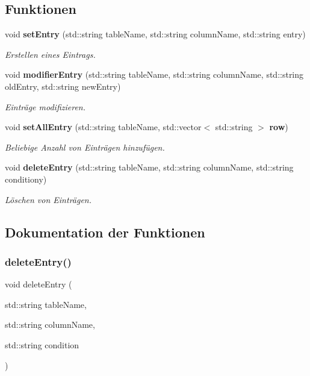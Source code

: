 \subsection*{Funktionen}
\begin{DoxyCompactItemize}
\item 
void \textbf{ set\+Entry} (std\+::string table\+Name, std\+::string column\+Name, std\+::string entry)
\begin{DoxyCompactList}\small\item\em Erstellen eines Eintrags. \end{DoxyCompactList}\item 
void \textbf{ modifier\+Entry} (std\+::string table\+Name, std\+::string column\+Name, std\+::string old\+Entry, std\+::string new\+Entry)
\begin{DoxyCompactList}\small\item\em Einträge modifizieren. \end{DoxyCompactList}\item 
void \textbf{ set\+All\+Entry} (std\+::string table\+Name, std\+::vector$<$ std\+::string $>$ \textbf{ row})
\begin{DoxyCompactList}\small\item\em Beliebige Anzahl von Einträgen hinzufügen. \end{DoxyCompactList}\item 
void \textbf{ delete\+Entry} (std\+::string table\+Name, std\+::string column\+Name, std\+::string conditiony)
\begin{DoxyCompactList}\small\item\em Löschen von Einträgen. \end{DoxyCompactList}\end{DoxyCompactItemize}


\subsection{Dokumentation der Funktionen}
\mbox{\label{entry_8hpp_a490d3fdb8238137f5d9f4a1fecaf2f96}} 
\subsubsection{delete\+Entry()}
{\footnotesize\ttfamily void delete\+Entry (\begin{DoxyParamCaption}\item[{std\+::string}]{table\+Name,  }\item[{std\+::string}]{column\+Name,  }\item[{std\+::string}]{condition }\end{DoxyParamCaption})}



